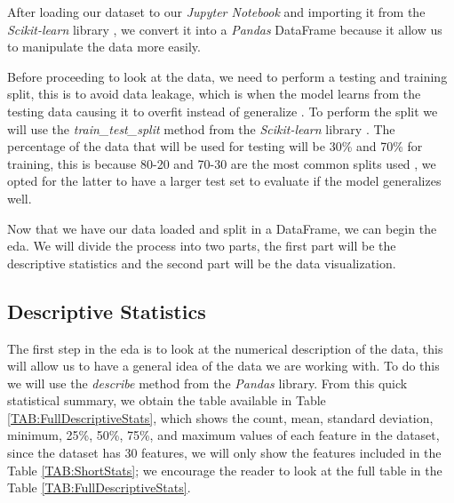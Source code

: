 After loading our dataset \cite{william_wolberg_breast_1993} to our \textit{Jupyter Notebook} and importing it from the \textit{Scikit-learn} library \cite{scikit_learn_sklearndatasetsload_breast_cancer_nodate}, we convert it into a \textit{Pandas}\cite{team_pandas-devpandas_2020} DataFrame because it allow us to manipulate the data more easily.

Before proceeding to look at the data, we need to perform a testing and training split, this is to avoid data leakage, 
which is when the model learns from the testing data causing it to overfit instead of generalize \cite{wang_machine_2020}. 
To perform the split we will use the \textit{train\_test\_split} method from the \textit{Scikit-learn} library \cite{pedregosa_scikit-learn_2011}.
The percentage of the data that will be used for testing will be 30\% and 70\% for training, this is because 80-20 and 70-30 are the most common splits used \cite{racz_effect_2021}, we opted for the latter to have a larger test set to evaluate if the model generalizes well.

Now that we have our data loaded and split in a DataFrame, we can begin the \ac{eda}. We will divide the process into two parts, the first part will be the descriptive statistics and the second part will be the data visualization.

\subsection{Descriptive Statistics}

The first step in the \ac{eda} is to look at the numerical description of the data, this will allow us to have a general idea of the data we are working with. To do this we will use the \textit{describe} method from the \textit{Pandas} library. From this quick statistical summary, we obtain the table available in Table \ref{TAB:FullDescriptiveStats}, which shows the count, mean, standard deviation, minimum, 25\%, 50\%, 75\%, and maximum values of each feature in the dataset, since the dataset has 30 features, we will only show the features included in the Table \ref{TAB:ShortStats}; we encourage the reader to look at the full table in the Table \ref{TAB:FullDescriptiveStats}.

